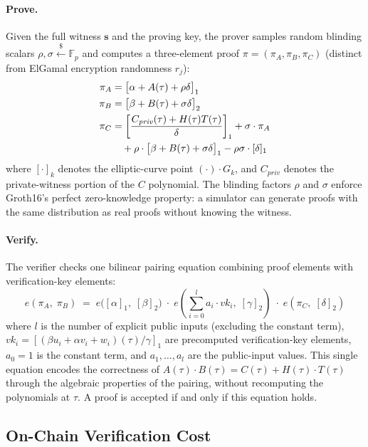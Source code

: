 \paragraph{Prove.}
Given the full witness $\mathbf{s}$ and the proving key, the prover samples random blinding scalars $\rho, \sigma \overset{\$}{\leftarrow} \mathbb{F}_p$ and computes a three-element proof $\pi = (\pi_A, \pi_B, \pi_C)$ (distinct from ElGamal encryption randomness $r_j$):
\begin{align}
    \pi_A &= \bigl[\alpha + A(\tau) + \rho\delta\bigr]_1 \\
    \pi_B &= \bigl[\beta + B(\tau) + \sigma\delta\bigr]_2 \\
    \pi_C &= \left[\frac{C_{\mathit{priv}}(\tau) + H(\tau)T(\tau)}{\delta}\right]_1 + \sigma \cdot \pi_A \\
          &\quad + \rho \cdot \bigl[\beta + B(\tau) + \sigma\delta\bigr]_1 - \rho\sigma \cdot [\delta]_1 \notag
\end{align}
where $[\cdot]_k$ denotes the elliptic-curve point $(\cdot) \cdot G_k$, and $C_{\mathit{priv}}$ denotes the private-witness portion of the $C$ polynomial. The blinding factors $\rho$ and $\sigma$ enforce Groth16's perfect zero-knowledge property: a simulator can generate proofs with the same distribution as real proofs without knowing the witness.

\paragraph{Verify.}
The verifier checks one bilinear pairing equation combining proof elements with verification-key elements:
\begin{equation}
    e(\pi_A,\; \pi_B) \;=\; e\bigl([\alpha]_1,\; [\beta]_2\bigr) \;\cdot\; e\!\left(\sum_{i=0}^{l} a_i \cdot \mathit{vk}_i,\; [\gamma]_2\right) \;\cdot\; e(\pi_C,\; [\delta]_2)
\end{equation}
where $l$ is the number of explicit public inputs (excluding the constant term), $\mathit{vk}_i = [(\beta u_i + \alpha v_i + w_i)(\tau)/\gamma]_1$ are precomputed verification-key elements, $a_0 = 1$ is the constant term, and $a_1,\dots,a_l$ are the public-input values. This single equation encodes the correctness of $A(\tau) \cdot B(\tau) = C(\tau) + H(\tau) \cdot T(\tau)$ through the algebraic properties of the pairing, without recomputing the polynomials at $\tau$. A proof is accepted if and only if this equation holds.

\subsection{On-Chain Verification Cost}

